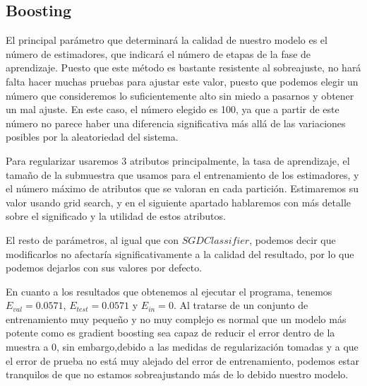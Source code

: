 \documentclass{article}
\begin{document}
	\subsection{Boosting}
	El principal parámetro que determinará la calidad de nuestro modelo es el número de estimadores, que indicará el número de etapas de la fase de aprendizaje. Puesto que este método es bastante resistente al sobreajuste, no hará falta hacer muchas pruebas para ajustar este valor, puesto que podemos elegir un número que consideremos lo suficientemente alto sin miedo a pasarnos y obtener un mal ajuste. En este caso, el número elegido es 100, ya que a partir de este número no parece haber una diferencia significativa más allá de las variaciones posibles por la aleatoriedad del sistema.
	\par 
	Para regularizar usaremos 3 atributos principalmente, la tasa de aprendizaje, el tamaño de la submuestra que usamos para el entrenamiento de los estimadores, y el número máximo de atributos que se valoran en cada partición. Estimaremos su valor usando grid search, y en el siguiente apartado hablaremos con más detalle sobre el significado y la utilidad de estos atributos.
	\par 
	El resto de parámetros, al igual que con $SGDClassifier$, podemos decir que modificarlos no afectaría significativamente a la calidad del resultado, por lo que podemos dejarlos con sus valores por defecto.
	\par 
	En cuanto a los resultados que obtenemos al ejecutar el programa, tenemos  $E_{val} = 0.0571$, $E_{test} = 0.0571$ y $E_{in} = 0$. Al tratarse de un conjunto de entrenamiento muy pequeño y no muy complejo es normal que un modelo más potente como es gradient boosting sea capaz de reducir el error dentro de la muestra a 0, sin embargo,debido a las medidas de regularización tomadas y a que el error de prueba no está muy alejado del error de entrenamiento, podemos estar tranquilos de que no estamos sobreajustando más de lo debido nuestro modelo.
	
\end{document}
